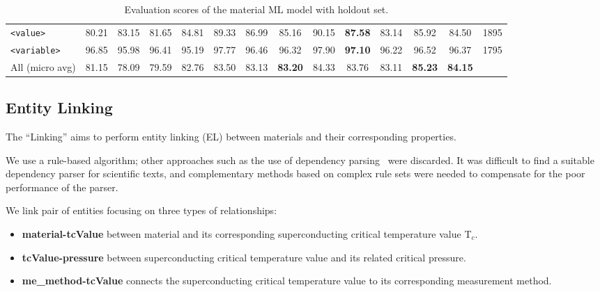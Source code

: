 \documentclass{article}
\newcommand{\tc}{T$_{c}$}
\begin{document}
\begin{table}[ht]
{\begin{tabular}{l ccc ccc ccc ccc r}
\texttt{<value>}       & 80.21 & 83.15 & 81.65 & 84.81 & 89.33 & 86.99 & 85.16 & 90.15 & \textbf{87.58} & 83.14 & 85.92 & 84.50 & 1895 \\
\texttt{<variable>}    & 96.85 & 95.98 & 96.41 & 95.19 & 97.77 & 96.46 & 96.32 & 97.90 & \textbf{97.10} & 96.22 & 96.52 & 96.37 & 1795 \\
\midrule
All (micro avg)       & 81.15 & 78.09 & 79.59 & 82.76 & 83.50 & 83.13 & \textbf{83.20} & 84.33 & 83.76 & 83.11 & \textbf{85.23} & \textbf{84.15} &   \\
\bottomrule
\end{tabular}
}
\caption{\label{tab:evaluation-10fold-material-parser} Evaluation scores of the material ML model with holdout set. }
\end{table}

\subsection{Entity Linking}
\label{subsubsec:linking}

The ``Linking'' aims to perform entity linking (EL) between materials and their corresponding properties.

We use a rule-based algorithm; other approaches such as the use of dependency parsing~\cite{yoshikawa:2017acl, Tiktinsky2020pyBARTES, swayamdipta:17, zhou-zhao-2019-head} were discarded. 
It was difficult to find a suitable dependency parser for scientific texts, and complementary methods based on complex rule sets were needed to compensate for the poor performance of the parser.

We link pair of entities focusing on three types of relationships: 
\begin{itemize}
    \item \textbf{material-tcValue} between material and its corresponding superconducting critical temperature value \tc. 
    \item \textbf{tcValue-pressure} between superconducting critical temperature value and its related critical pressure.
    \item \textbf{me\_method-tcValue} connects the superconducting critical temperature value to its corresponding measurement method.
\end{itemize}
\end{document}
